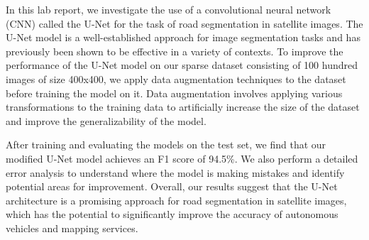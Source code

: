 \documentclass[10pt,conference,compsocconf]{IEEEtran}
\begin{document}
In this lab report, we investigate the use of a convolutional neural network (CNN) called the U-Net for the task of road segmentation in satellite images. The U-Net model is a well-established approach for image segmentation tasks and has previously been shown to be effective in a variety of contexts. To improve the performance of the U-Net model on our sparse dataset consisting of 100 hundred images of size 400x400, we apply data augmentation techniques to the dataset before training the model on it. Data augmentation involves applying various transformations to the training data to artificially increase the size of the dataset and improve the generalizability of the model.

After training and evaluating the models on the test set, we find that our modified U-Net model achieves an F1 score of 94.5\%. We also perform a detailed error analysis to understand where the model is making mistakes and identify potential areas for improvement. Overall, our results suggest that the U-Net architecture is a promising approach for road segmentation in satellite images, which has the potential to significantly improve the accuracy of autonomous vehicles and mapping services.



\end{document}
